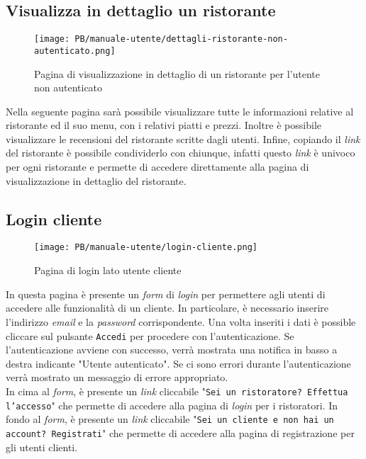 \subsection{Visualizza in dettaglio un ristorante}

\begin{figure}[htbp]
    \centering
	\texttt{[image: PB/manuale-utente/dettagli-ristorante-non-autenticato.png]}
    \caption{Pagina di visualizzazione in dettaglio di un ristorante per l'utente non autenticato}
\end{figure}
Nella seguente pagina sarà possibile visualizzare tutte le informazioni relative 
al ristorante ed il suo menu, con 
i relativi piatti e prezzi. Inoltre è possibile visualizzare le recensioni del ristorante scritte dagli utenti.
Infine, copiando il \textit{link} del ristorante è possibile condividerlo con chiunque,
infatti questo \textit{link} è univoco per ogni ristorante e permette di accedere 
direttamente alla pagina di visualizzazione in dettaglio del ristorante.

\subsection{Login cliente}

\begin{figure}[htbp]
    \centering
	\texttt{[image: PB/manuale-utente/login-cliente.png]}
    \caption{Pagina di login lato utente cliente}
\end{figure}

In questa pagina è presente un \textit{form} di \textit{login} per permettere agli utenti di
accedere alle funzionalità di un cliente. In particolare, è necessario inserire
l'indirizzo \textit{email} e la \textit{password} corrispondente. Una volta inseriti i dati è
possible cliccare sul pulsante \texttt{Accedi} per procedere con 
l'autenticazione. Se l'autenticazione avviene con successo, verrà mostrata una
notifica in basso a destra indicante "Utente autenticato". Se ci sono errori
durante l'autenticazione verrà mostrato un messaggio di errore appropriato.\\
In cima al \textit{form}, è presente un \textit{link} cliccabile "\texttt{Sei un ristoratore? Effettua l'accesso}" che permette di accedere alla pagina di \textit{login} per
i ristoratori. In fondo al \textit{form}, è presente un \textit{link} cliccabile "\texttt{Sei un cliente e 
non hai un account? Registrati}" che permette di accedere alla pagina di 
registrazione per gli utenti clienti.

